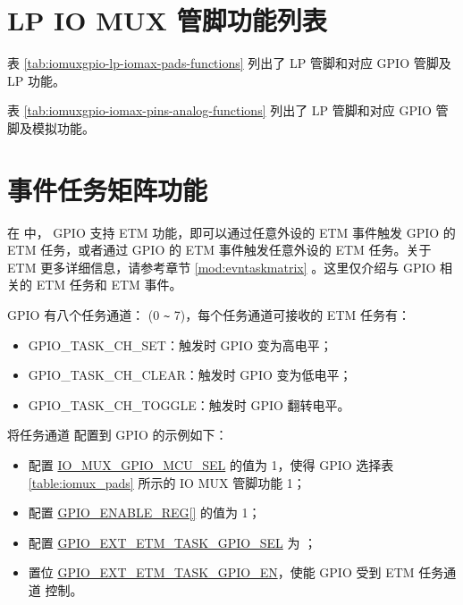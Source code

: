 \documentclass[main\_\_CN.tex]{subfiles}
\begin{document}


\section{LP IO MUX 管脚功能列表}
\label{sec:rtcmux_pins}
表 \ref{tab:iomuxgpio-lp-iomax-pads-functions} 列出了 LP 管脚和对应 GPIO 管脚及 LP 功能。  



表 \ref{tab:iomuxgpio-iomax-pins-analog-functions} 列出了 LP 管脚和对应 GPIO 管脚及模拟功能。






\section{事件任务矩阵功能}

在 \chipname{} 中， GPIO 支持 ETM 功能，即可以通过任意外设的 ETM 事件触发 GPIO 的 ETM 任务，或者通过 GPIO 的 ETM 事件触发任意外设的 ETM 任务。关于 ETM 更多详细信息，请参考章节 \ref{mod:evntaskmatrix} \textit{}。这里仅介绍与 GPIO 相关的 ETM 任务和 ETM 事件。




GPIO 有八个任务通道： (0 \verb+~+ 7)，每个任务通道可接收的 ETM 任务有：

\begin{itemize}
    \item GPIO\_TASK\_CH\_SET：触发时 GPIO 变为高电平；
    \item GPIO\_TASK\_CH\_CLEAR：触发时 GPIO 变为低电平；
    \item GPIO\_TASK\_CH\_TOGGLE：触发时 GPIO 翻转电平。
\end{itemize}

将任务通道  配置到 GPIO 的示例如下：

\begin{itemize}
    \item 配置 \hyperref[fielddesc:IOMUXGPIONMCUSEL]{IO\_MUX\_GPIO\_MCU\_SEL} 的值为 1，使得 GPIO 选择表 \ref{table:iomux_pads} 所示的 IO MUX 管脚功能 1；
    \item 配置 \hyperref[regdesc:GPIOENABLEREG]{GPIO\_ENABLE\_REG[]} 的值为 1；
    \item 配置 \hyperref[fielddesc:GPIOSDETMTASKGPIO0SEL]{GPIO\_EXT\_ETM\_TASK\_GPIO\_SEL} 为 ；
    \item 置位 \hyperref[fielddesc:GPIOSDETMTASKGPIO0EN]{GPIO\_EXT\_ETM\_TASK\_GPIO\_EN}，使能 GPIO 受到 ETM 任务通道  控制。
\end{itemize}
\end{document}
